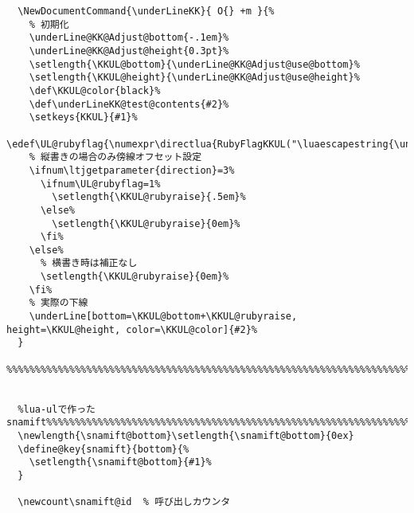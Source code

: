 \documentclass[luatex,fontsize=8pt,paper=b5,twoside]{jlreq}%
\begin{document}
\begin{lstlisting}
  \NewDocumentCommand{\underLineKK}{ O{} +m }{%
    % 初期化
    \underLine@KK@Adjust@bottom{-.1em}%
    \underLine@KK@Adjust@height{0.3pt}%
    \setlength{\KKUL@bottom}{\underLine@KK@Adjust@use@bottom}%
    \setlength{\KKUL@height}{\underLine@KK@Adjust@use@height}%
    \def\KKUL@color{black}%
    \def\underLineKK@test@contents{#2}%
    \setkeys{KKUL}{#1}%
    \edef\UL@rubyflag{\numexpr\directlua{RubyFlagKKUL("\luaescapestring{\unexpanded\expandafter{\underLineKK@test@contents}}")}\relax}%
    % 縦書きの場合のみ傍線オフセット設定
    \ifnum\ltjgetparameter{direction}=3%
      \ifnum\UL@rubyflag=1%
        \setlength{\KKUL@rubyraise}{.5em}%
      \else%
        \setlength{\KKUL@rubyraise}{0em}%
      \fi%
    \else%
      % 横書き時は補正なし
      \setlength{\KKUL@rubyraise}{0em}%
    \fi%
    % 実際の下線
    \underLine[bottom=\KKUL@bottom+\KKUL@rubyraise, height=\KKUL@height, color=\KKUL@color]{#2}%
  }
  %%%%%%%%%%%%%%%%%%%%%%%%%%%%%%%%%%%%%%%%%%%%%%%%%%%%%%%%%%%%%%%%%%%%%%%%%%%%%%%%%%%%%%%%%


  %lua-ulで作ったsnamift%%%%%%%%%%%%%%%%%%%%%%%%%%%%%%%%%%%%%%%%%%%%%%%%%%%%%%%%%%%%%%%%%%%
  \newlength{\snamift@bottom}\setlength{\snamift@bottom}{0ex}
  \define@key{snamift}{bottom}{%
    \setlength{\snamift@bottom}{#1}%
  }

  \newcount\snamift@id  % 呼び出しカウンタ


\end{lstlisting}
\end{document}
